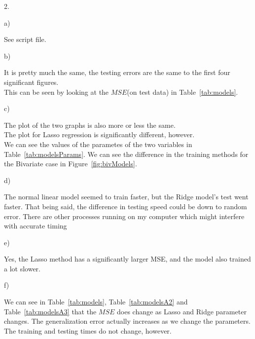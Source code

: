 \documentclass[a4paper,12pt]{article}
\newlength{\QNo}
\begin{document}
2. 
\begin{minipage}[t]{0.90\dimexpr\textwidth}
  a)
  \begin{minipage}[t]{\dimexpr\textwidth}
    See script file.\\
  \end{minipage}

  b)
  \begin{minipage}[t]{\dimexpr\textwidth-\QNo}
    It is pretty much the same, the testing errors are the same to the first four significant figures.\\
    This can be seen by looking at the $MSE$(on test data) in Table~\ref{tab:models}.\\
  \end{minipage}

  c)
  \begin{minipage}[t]{\dimexpr\textwidth-\QNo}
    The plot of the two graphs is also more or less the same.\\
    The plot for Lasso regression is significantly different, however.\\
    We can see the values of the parametes of the two variables in Table~\ref{tab:modelsParams}.
    We can see the difference in the training methods for the Bivariate case in Figure~\ref{fig:bivModels}.\\
  \end{minipage}

  d)
  \begin{minipage}[t]{\dimexpr\textwidth-\QNo}
    The normal linear model seemed to train faster, but the Ridge model's test went faster.
    That being said, the difference in testing speed could be down to random error.
    There are other processes running on my computer which might interfere with accurate timing\\
  \end{minipage}

  e)
  \begin{minipage}[t]{\dimexpr\textwidth-\QNo}
    Yes, the Lasso method has a significantly larger MSE, and the model also trained a lot slower.\\
  \end{minipage}

  f)
  \begin{minipage}[t]{\dimexpr\textwidth-\QNo}
    We can see in Table~\ref{tab:models}, Table~\ref{tab:modelsA2} and Table~\ref{tab:modelsA3} that the $MSE$ does change as Lasso and Ridge parameter changes.
    The generalization error actually increases as we change the parameters.
    The training and testing times do not change, however.\\
  \end{minipage}


\end{minipage}
\end{document}
